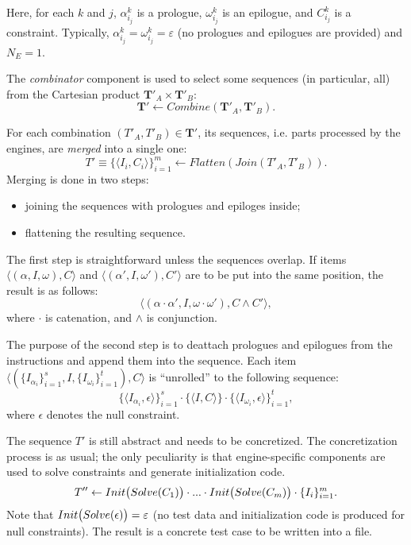Here, for each $k$ and $j$, $\alpha_{i_j}^k$ is a prologue, $\omega_{i_j}^k$ is an epilogue, and $C_{i_j}^k$ is a constraint.
Typically, $\alpha_{i_j}^k=\omega_{i_j}^k=\varepsilon$ (no prologues and epilogues are provided) and $N_E=1$.

The \emph{combinator} component is used to select some sequences (in particular, all) from the Cartesian product $\textbf{T}'_A \times \textbf{T}'_B$:
$$\textbf{T}' \leftarrow Combine(\textbf{T}'_A, \textbf{T}'_B).$$

For each combination $(T'_A, T'_B) \in \textbf{T}'$, its sequences, i.e. parts processed by the engines, are \emph{merged} into a single one:
$$T' \equiv \{\langle I_i, C_i \rangle\}_{i=1}^m \leftarrow Flatten(Join(T'_A, T'_B)).$$
Merging is done in two steps:

\begin{itemize}
\item
joining the sequences with prologues and epiloges inside;
\item
flattening the resulting sequence.
\end{itemize}

The first step is straightforward unless the sequences overlap.
If items $\langle (\alpha, I, \omega), C \rangle$ and $\langle (\alpha', I, \omega'), C' \rangle$ are to be put into the same position, the result is as follows:
$$\langle (\alpha \cdot \alpha', I, \omega \cdot \omega'), C \wedge C' \rangle,$$
where $\cdot$ is catenation, and $\wedge$ is conjunction.

The purpose of the second step is to deattach prologues and epilogues from the instructions and append them into the sequence.
Each item $\langle (\{I_{\alpha_i}\}_{i=1}^s, I, \{I_{\omega_i}\}_{i=1}^t), C \rangle$ is ``unrolled'' to the following sequence:
$$\{\langle I_{\alpha_i}, \epsilon \rangle\}_{i=1}^s \cdot \{\langle I, C \rangle\} \cdot \{\langle I_{\omega_i}, \epsilon \rangle\}_{i=1}^t,$$
where $\epsilon$ denotes the null constraint.

The sequence $T'$ is still abstract and needs to be concretized.
The concretization process is as usual; the only peculiarity is that engine-specific components are used to solve constraints and generate initialization code.
$$T'' \leftarrow Init\big{(}Solve(C_1)\big{)} \cdot ... \cdot Init\big{(}Solve(C_m)\big{)} \cdot \{I_i\}_{i=1}^m.$$
Note that $Init\big{(}Solve(\epsilon)\big{)}=\varepsilon$ (no test data and initialization code is produced for null constraints).
The result is a concrete test case to be written into a file.

